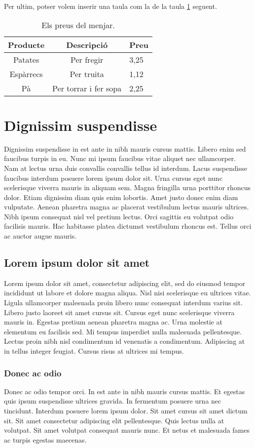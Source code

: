 Per ultim, potser volem inserir una taula com la de la taula \ref{taula:preus_menjar} seguent.
\begin{table}[h!]
\centering
\begin{tabular}{|c|c|l|}
    \hline
    Producte & Descripció & Preu \\
    \hline
    Patates & Per fregir & 3,25 \\
    Espàrrecs & Per truita & 1,12 \\
    Pà & Per torrar i fer sopa & 2,25 \\
    \hline
\end{tabular}
\caption{Els preus del menjar.}
\label{taula:preus_menjar}
\end{table}

\section{Dignissim suspendisse}
Dignissim suspendisse in est ante in nibh mauris cursus mattis. Libero enim sed faucibus turpis in eu. Nunc mi ipsum faucibus vitae aliquet nec ullamcorper. Nam at lectus urna duis convallis convallis tellus id interdum. Lacus suspendisse faucibus interdum posuere lorem ipsum dolor sit. Urna cursus eget nunc scelerisque viverra mauris in aliquam sem. Magna fringilla urna porttitor rhoncus dolor. Etiam dignissim diam quis enim lobortis. Amet justo donec enim diam vulputate. Aenean pharetra magna ac placerat vestibulum lectus mauris ultrices. Nibh ipsum consequat nisl vel pretium lectus. Orci sagittis eu volutpat odio facilisis mauris. Hac habitasse platea dictumst vestibulum rhoncus est. Tellus orci ac auctor augue mauris.

\subsection{Lorem ipsum dolor sit amet}
Lorem ipsum dolor sit amet, consectetur adipiscing elit, sed do eiusmod tempor incididunt ut labore et dolore magna aliqua. Nisl nisi scelerisque eu ultrices vitae. Ligula ullamcorper malesuada proin libero nunc consequat interdum varius sit. Libero justo laoreet sit amet cursus sit. Cursus eget nunc scelerisque viverra mauris in. Egestas pretium aenean pharetra magna ac. Urna molestie at elementum eu facilisis sed. Mi tempus imperdiet nulla malesuada pellentesque. Lectus proin nibh nisl condimentum id venenatis a condimentum. Adipiscing at in tellus integer feugiat. Cursus risus at ultrices mi tempus.

\subsubsection{Donec ac odio}
Donec ac odio tempor orci. In est ante in nibh mauris cursus mattis. Et egestas quis ipsum suspendisse ultrices gravida. In fermentum posuere urna nec tincidunt. Interdum posuere lorem ipsum dolor. Sit amet cursus sit amet dictum sit. Sit amet consectetur adipiscing elit pellentesque. Quis lectus nulla at volutpat. Sit amet volutpat consequat mauris nunc. Et netus et malesuada fames ac turpis egestas maecenas.

